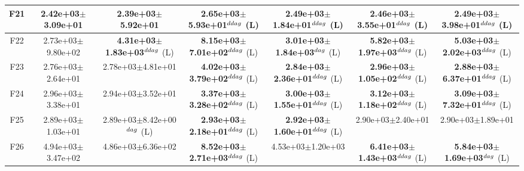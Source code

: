 \begin{table}[!t]
\begin{tabular}{c|cccccc}
F21  & 2.42e+03$\pm$3.09e+01  & 2.39e+03$\pm$5.92e+01   & \textbf{2.65e+03$\pm$5.93e+01}$^{\\ddag}$ (L)  & \textbf{2.49e+03$\pm$1.84e+01}$^{\\ddag}$ (L)  & \textbf{2.46e+03$\pm$3.55e+01}$^{\\ddag}$ (L)  & \textbf{2.49e+03$\pm$3.98e+01}$^{\\ddag}$ (L) \\ \hline
F22  & 2.73e+03$\pm$9.80e+02  & \textbf{4.31e+03$\pm$1.83e+03}$^{\\ddag}$ (L)  & \textbf{8.15e+03$\pm$7.01e+02}$^{\\ddag}$ (L)  & \textbf{3.01e+03$\pm$1.84e+03}$^{\\dag}$ (L)  & \textbf{5.82e+03$\pm$1.97e+03}$^{\\ddag}$ (L)  & \textbf{5.03e+03$\pm$2.02e+03}$^{\\ddag}$ (L) \\ \hline
F23  & 2.76e+03$\pm$2.64e+01  & 2.78e+03$\pm$4.81e+01   & \textbf{4.02e+03$\pm$3.79e+02}$^{\\ddag}$ (L)  & \textbf{2.84e+03$\pm$2.36e+01}$^{\\ddag}$ (L)  & \textbf{2.96e+03$\pm$1.05e+02}$^{\\ddag}$ (L)  & \textbf{2.88e+03$\pm$6.37e+01}$^{\\ddag}$ (L) \\ \hline
F24  & 2.96e+03$\pm$3.38e+01  & 2.94e+03$\pm$3.52e+01   & \textbf{3.37e+03$\pm$3.28e+02}$^{\\ddag}$ (L)  & \textbf{3.00e+03$\pm$1.55e+01}$^{\\ddag}$ (L)  & \textbf{3.12e+03$\pm$1.18e+02}$^{\\ddag}$ (L)  & \textbf{3.09e+03$\pm$7.32e+01}$^{\\ddag}$ (L) \\ \hline
F25  & 2.89e+03$\pm$1.03e+01  & 2.89e+03$\pm$8.42e+00$^{\\dag}$ (L)  & \textbf{2.93e+03$\pm$2.18e+01}$^{\\ddag}$ (L)  & \textbf{2.92e+03$\pm$1.60e+01}$^{\\ddag}$ (L)  & 2.90e+03$\pm$2.40e+01   & 2.90e+03$\pm$1.89e+01  \\ \hline
F26  & 4.94e+03$\pm$3.47e+02  & 4.86e+03$\pm$6.36e+02   & \textbf{8.52e+03$\pm$2.71e+03}$^{\\ddag}$ (L)  & 4.53e+03$\pm$1.20e+03   & \textbf{6.41e+03$\pm$1.43e+03}$^{\\ddag}$ (L)  & \textbf{5.84e+03$\pm$1.69e+03}$^{\\dag}$ (L) \\ \hline

\end{tabular}
\end{table}
